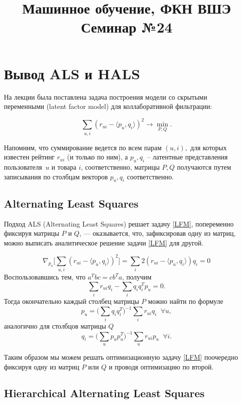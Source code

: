 \documentclass[12pt,a4paper]{article}
\title{Машинное обучение, ФКН ВШЭ\\Семинар №24}
\author{}
\date{}
\begin{document}
\maketitle

\section{Вывод ALS и HALS}

На лекции была поставлена задача построения модели со скрытыми переменными (latent factor model) для коллаборативной фильтрации:

\[
	\sum_{u,i} (r_{ui} - \langle p_u, q_i \rangle)^2 \to \min_{P,Q}.
\label{LFM}
\]

Напомним, что суммирование ведется по всем парам $(u, i),$ для которых известен рейтинг $r_{ui}$ (и только по ним), а $p_u, q_i$ – латентные представления пользователя~$u$ и товара $i$, соответственно, матрицы $P, Q$ получаются путем записывания по столбцам векторов $p_u, q_i$ соответственно.

\subsection{Alternating Least Squares}

Подход ALS (Alternating Least Squares) решает задачу \eqref{LFM}, попеременно фиксируя матрицы $P$ и $Q$, — оказывается, что, зафиксировав одну из матриц, можно выписать аналитическое решение задачи \eqref{LFM} для другой.

\[
	\nabla_{p_u} \bigg[ \sum_{u,i} (r_{ui} - \langle p_u, q_i \rangle)^2 \bigg] = \sum_{i} 2(r_{ui} - \langle p_u, q_i \rangle)q_i = 0
\]
Воспользовавшись тем, что $a^Tbc = cb^Ta$, получим
\[
	\sum_{i} r_{ui}q_i - \sum_i q_i q_i^T p_u = 0.
\]
Тогда окончательно каждый столбец матрицы $P$ можно найти по формуле
\[
	p_u = \bigg( \sum_i q_i q_i^T\bigg)^{-1}\sum_ir_{ui}q_i \;\; \forall u,
\]
аналогично для столбцов матрицы $Q$
\[
	q_i = \bigg( \sum_u p_u p_u^T\bigg)^{-1}\sum_ur_{ui}p_u \;\; \forall i.
\]

Таким образом мы можем решать оптимизационную задачу \eqref{LFM} поочередно фиксируя одну из матриц $P$ или $Q$ и проводя оптимизацию по второй.

\subsection{Hierarchical Alternating Least Squares}
\end{document}
